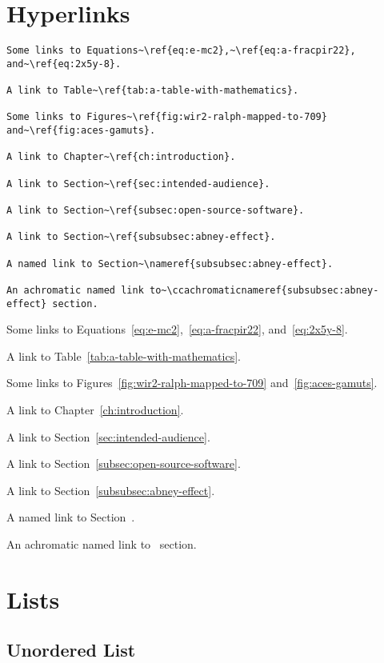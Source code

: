 \section*{Hyperlinks}
\label{sec:hyperlinks}

\begin{lstlisting}[caption={Hyperlinks.}]
Some links to Equations~\ref{eq:e-mc2},~\ref{eq:a-fracpir22}, and~\ref{eq:2x5y-8}.

A link to Table~\ref{tab:a-table-with-mathematics}.

Some links to Figures~\ref{fig:wir2-ralph-mapped-to-709} and~\ref{fig:aces-gamuts}.

A link to Chapter~\ref{ch:introduction}.

A link to Section~\ref{sec:intended-audience}.

A link to Section~\ref{subsec:open-source-software}.

A link to Section~\ref{subsubsec:abney-effect}.

A named link to Section~\nameref{subsubsec:abney-effect}.

An achromatic named link to~\ccachromaticnameref{subsubsec:abney-effect} section.
\end{lstlisting}

Some links to Equations~\ref{eq:e-mc2},~\ref{eq:a-fracpir22}, and~\ref{eq:2x5y-8}.

A link to Table~\ref{tab:a-table-with-mathematics}.

Some links to Figures~\ref{fig:wir2-ralph-mapped-to-709} and~\ref{fig:aces-gamuts}.

A link to Chapter~\ref{ch:introduction}.

A link to Section~\ref{sec:intended-audience}.

A link to Section~\ref{subsec:open-source-software}.

A link to Section~\ref{subsubsec:abney-effect}.

A named link to Section~.

An achromatic named link to~ section.

\section*{Lists}
\label{sec:lists}

\subsection*{Unordered List}
\label{subsec:unordered-list}

